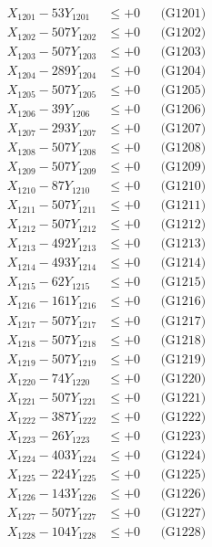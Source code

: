 \documentclass[a4paper,10pt]{article}
\begin{document}
{\begin{align}
\allowbreak
X_{1201} - 53Y_{1201} &\leq +0 && \text{(G1201)} \\
X_{1202} - 507Y_{1202} &\leq +0 && \text{(G1202)} \\
X_{1203} - 507Y_{1203} &\leq +0 && \text{(G1203)} \\
X_{1204} - 289Y_{1204} &\leq +0 && \text{(G1204)} \\
X_{1205} - 507Y_{1205} &\leq +0 && \text{(G1205)} \\
X_{1206} - 39Y_{1206} &\leq +0 && \text{(G1206)} \\
X_{1207} - 293Y_{1207} &\leq +0 && \text{(G1207)} \\
X_{1208} - 507Y_{1208} &\leq +0 && \text{(G1208)} \\
X_{1209} - 507Y_{1209} &\leq +0 && \text{(G1209)} \\
X_{1210} - 87Y_{1210} &\leq +0 && \text{(G1210)} \\
\allowbreak
X_{1211} - 507Y_{1211} &\leq +0 && \text{(G1211)} \\
X_{1212} - 507Y_{1212} &\leq +0 && \text{(G1212)} \\
X_{1213} - 492Y_{1213} &\leq +0 && \text{(G1213)} \\
X_{1214} - 493Y_{1214} &\leq +0 && \text{(G1214)} \\
X_{1215} - 62Y_{1215} &\leq +0 && \text{(G1215)} \\
X_{1216} - 161Y_{1216} &\leq +0 && \text{(G1216)} \\
X_{1217} - 507Y_{1217} &\leq +0 && \text{(G1217)} \\
X_{1218} - 507Y_{1218} &\leq +0 && \text{(G1218)} \\
X_{1219} - 507Y_{1219} &\leq +0 && \text{(G1219)} \\
X_{1220} - 74Y_{1220} &\leq +0 && \text{(G1220)} \\
\allowbreak
X_{1221} - 507Y_{1221} &\leq +0 && \text{(G1221)} \\
X_{1222} - 387Y_{1222} &\leq +0 && \text{(G1222)} \\
X_{1223} - 26Y_{1223} &\leq +0 && \text{(G1223)} \\
X_{1224} - 403Y_{1224} &\leq +0 && \text{(G1224)} \\
X_{1225} - 224Y_{1225} &\leq +0 && \text{(G1225)} \\
X_{1226} - 143Y_{1226} &\leq +0 && \text{(G1226)} \\
X_{1227} - 507Y_{1227} &\leq +0 && \text{(G1227)} \\
X_{1228} - 104Y_{1228} &\leq +0 && \text{(G1228)} \\

\end{align}}
\end{document}
